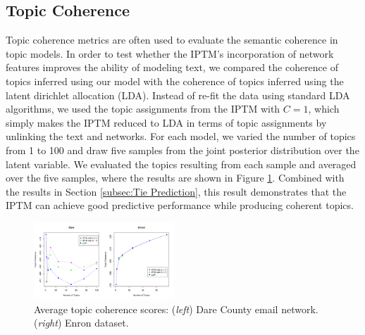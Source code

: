 \documentclass[twoside]{article}
\begin{document}
\subsection{Topic Coherence}\label{subsec:Topic Coherence}
Topic coherence metrics \cite{mimno2011optimizing} are often used to evaluate the semantic coherence in topic models. In order to test whether the IPTM's incorporation of network features improves the ability of modeling text, we compared the coherence of topics inferred using our model with the coherence of topics inferred using the latent dirichlet allocation (LDA). Instead of re-fit the data using standard LDA algorithms, we used the topic assignments from the IPTM with $C=1$, which simply makes the IPTM reduced to LDA in terms of topic assignments by unlinking the text and networks. For each model, we varied the number of topics from 1 to 100 and draw five samples from the joint posterior distribution over the latent variable. We evaluated the topics resulting from each sample and averaged over the five samples, where the results are shown in Figure \ref{fig:topic}. Combined with the results in Section \ref{subsec:Tie Prediction}, this result demonstrates that the IPTM can achieve good predictive performance while producing coherent topics. 
\begin{figure}[h]
	\centering
	\includegraphics[width = 0.47\textwidth]{plots/topic_coherence-1.png}
	\caption{Average topic coherence scores: (\textit{left}) Dare County email network. (\textit{right}) Enron dataset.}
	\label{fig:topic}
	\end{figure}
\end{document}
